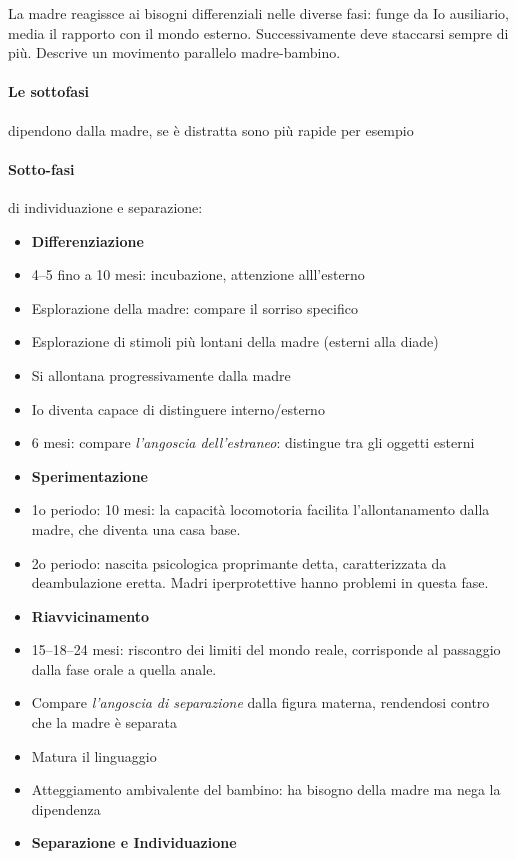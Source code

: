 \documentclass[12pt, a4paper]{article}
\begin{document}
La madre reagissce ai bisogni differenziali nelle diverse fasi: funge da Io ausiliario, media il rapporto con il mondo esterno. Successivamente deve staccarsi sempre di pi\`u. Descrive un movimento parallelo madre-bambino.  

\paragraph{Le sottofasi} dipendono dalla madre, se \`e distratta sono pi\`u rapide per esempio

\paragraph{Sotto-fasi} di individuazione e separazione:
\begin{itemize}
    \item \textbf{Differenziazione}
    \item 4--5 fino a 10 mesi: incubazione, attenzione alll'esterno
    \item Esplorazione della madre: compare il sorriso specifico
    \item Esplorazione di stimoli pi\`u lontani della madre (esterni alla diade)
    \item Si allontana progressivamente dalla madre
    \item Io diventa capace di distinguere interno/esterno
    \item 6 mesi: compare \emph{l'angoscia dell'estraneo}: distingue tra gli oggetti esterni
    \item \textbf{Sperimentazione}
    \item 1o periodo: 10 mesi: la capacit\`a locomotoria facilita l'allontanamento dalla madre, che diventa una casa base.
    \item 2o periodo: nascita psicologica proprimante detta, caratterizzata da deambulazione eretta. Madri iperprotettive hanno problemi in questa fase.
    \item \textbf{Riavvicinamento}
    \item 15--18--24 mesi: riscontro dei limiti del mondo reale, corrisponde al passaggio dalla fase orale a quella anale.
    \item Compare \emph{l'angoscia di separazione} dalla figura materna, rendendosi contro che la madre \`e separata
    \item Matura il linguaggio
    \item Atteggiamento ambivalente del bambino: ha bisogno della madre ma nega la dipendenza
    \item \textbf{Separazione e Individuazione}

\end{itemize}
\end{document}
